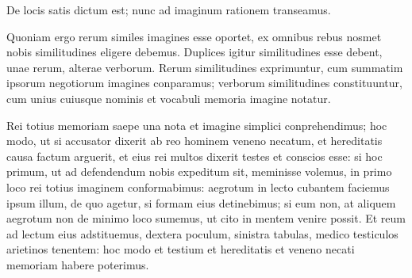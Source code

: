 De locis satis dictum est; nunc ad imaginum rationem transeamus.

Quoniam ergo rerum similes imagines esse oportet, ex omnibus rebus nosmet nobis similitudines eligere debemus. Duplices igitur similitudines esse debent, unae rerum, alterae verborum. Rerum similitudines exprimuntur, cum summatim ipsorum negotiorum imagines conparamus; verborum similitudines constituuntur, cum unius cuiusque nominis et vocabuli memoria imagine notatur.

Rei totius memoriam saepe una nota et imagine simplici conprehendimus; hoc modo, ut si accusator dixerit ab reo hominem veneno necatum, et hereditatis causa factum arguerit, et eius rei multos dixerit testes et conscios esse: si hoc primum, ut ad defendendum nobis expeditum sit, meminisse volemus, in primo loco rei totius imaginem conformabimus: aegrotum in lecto cubantem faciemus ipsum illum, de quo agetur, si formam eius detinebimus; si eum non, at aliquem aegrotum non de minimo loco sumemus, ut cito in mentem venire possit. Et reum ad lectum eius adstituemus, dextera poculum, sinistra tabulas, medico testiculos arietinos tenentem: hoc modo et testium et hereditatis et veneno necati memoriam habere poterimus.


